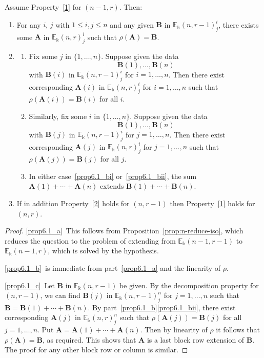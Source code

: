 \documentclass[ALCO,ThmDefs,Unicode,epreuves]{cedram}
\newcommand{\E}{\mathbb{E}}
\newcommand{\bA}{\mathbf{A}}
\newcommand{\bB}{\mathbf{B}}
\begin{document}
\begin{prop}\label{prop:extend}
Assume Property~\ref{1} for $(n-1,r)$. Then:
\begin{enumerate}[label=(\alph*)]
\item\label{prop6.1_a} For any $i$, $j$ with $1 \le i,j \le n$ and any given $\bB$ in
 $\E_\Bbbk(n,r-1)^i_j$, there exists some $\bA$ in
 $\E_\Bbbk(n,r)^i_j$ such that $\rho(\bA) = \bB$.

\item\label{prop6.1_b} 
 \begin{enumerate}[label=(\roman*)]
 \item\label{prop6.1_bi} Fix some $j$ in $\{1, \dots, n\}$. Suppose given
 the data
 \[\bB(1), \dots, \bB(n)\] with $\bB(i)$ in
 $\E_\Bbbk(n,r-1)^i_j$ for $i = 1, \dots, n$. Then there exist
 corresponding $\bA(i)$ in $\E_\Bbbk(n,r)^i_j$ for $i = 1, \dots, n$
 such that $\rho(\bA(i)) = \bB(i)$ for all $i$. 

 \item\label{prop6.1_bii} Similarly, fix some $i$ in $\{1, \dots, n\}$. Suppose
 given the data
 \[\bB(1), \dots, \bB(n)\] with 
 $\bB(j)$ in
 $\E_\Bbbk(n,r-1)^i_j$ for $j = 1, \dots, n$. Then there exist
 corresponding $\bA(j)$ in $\E_\Bbbk(n,r)^i_j$ for $j = 1, \dots, n$
 such that $\rho(\bA(j)) = \bB(j)$ for all $j$. 

 \item\label{prop6.1_biii} In either case~\ref{prop6.1_bi} or~\ref{prop6.1_bii}, the sum $\bA(1)
 + \cdots + \bA(n)$ extends $\bB(1) + \cdots + \bB(n)$.
 \end{enumerate}
 
\item\label{prop6.1_c} If in addition Property~\ref{2} holds for $(n,r-1)$ then
 Property~\ref{1} holds for $(n,r)$.
\end{enumerate}
\end{prop}

\begin{proof}
\ref{prop6.1_a}~This follows from Proposition~\ref{prop:n-reduce-iso}, which
 reduces the question to the problem of extending from
 $\E_\Bbbk(n-1,r-1)$ to $\E_\Bbbk(n-1,r)$, which is solved by the
 hypothesis.

\ref{prop6.1_b}~is immediate from part~\ref{prop6.1_a} and the linearity of $\rho$.

\ref{prop6.1_c}~Let $\bB$ in $\E_\Bbbk(n,r-1)$ be given. By the decomposition
 property for $(n,r-1)$, we can find $\bB(j)$ in
 $\E_\Bbbk(n,r-1)^n_j$ for $j = 1, \dots, n$ such that $\bB = \bB(1)
 + \cdots + \bB(n)$. By part~\ref{prop6.1_b}\ref{prop6.1_bii}, there exist corresponding
 $\bA(j)$ in $\E_\Bbbk(n,r)^n_j$ such that $\rho(\bA(j)) = \bB(j)$
 for all $j = 1, \dots, n$. Put $\bA = \bA(1) + \cdots +
 \bA(n)$. Then by linearity of $\rho$ it follows that $\rho(\bA) =
 \bB$, as required. This shows that $\bA$ is a last block row
 extension of $\bB$. The proof for any other block row or column is
 similar.
\end{proof}
\end{document}
